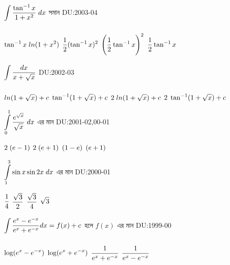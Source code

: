 \documentclass[addpoints]{exam}
\begin{document}
\begin{questions}
\question  $\mathlarger{\int\limits_{}^{} \frac{\tan^{-1}x}{1+x^2}\;dx}$  সমান
\hfill \textsc{DU:2003-04}

\begin{oneparchoices}

\choice $\mathlarger{\tan^{-1}x\;ln(1+x^2)}$
\choice $\mathlarger{\frac{1}{2} (\tan ^{-1}x)^{2}}$
\choice $\mathlarger{\Bigg(\frac{1}{2} \tan ^{-1}x\Bigg)^{2}}$
\choice $\mathlarger{\frac{1}{2} \tan ^{-1}x}$
\end{oneparchoices}

\question  $\mathlarger{\int\limits_{}^{} \frac{dx}{x+\sqrt{x}}}$
\hfill \textsc{DU:2002-03}

\begin{oneparchoices}

\choice $\mathlarger{ln(1+\sqrt{x})+c}$
\choice $\mathlarger{\tan ^{-1}(1+\sqrt{x})+c}$
\choice $\mathlarger{2\;ln(1+\sqrt{x})+c}$
\choice $\mathlarger{2\;\tan ^{-1}(1+\sqrt{x})+c}$
\end{oneparchoices}

\question  $\mathlarger{\int\limits_{0}^{1} \frac{e^{\sqrt{x}}}{\sqrt{x}}\;dx}$ এর মান
\hfill \textsc{DU:2001-02,00-01}

\begin{oneparchoices}

\choice $\mathlarger{2\;(e-1)}$
\choice $\mathlarger{2\;(e+1)}$
\choice $\mathlarger{(1-e)}$
\choice $\mathlarger{(e+1)}$
\end{oneparchoices}

\question   $\mathlarger{\int\limits_{1}^{3} \sin x \sin 2x\;dx}$  এর মান \hfill \textsc{DU:2000-01}

\begin{oneparchoices}
 \choice $\mathlarger{\frac{1}{4}}$
 \choice $\mathlarger{\frac{\sqrt{3}}{2}}$
\choice $\mathlarger{\frac{\sqrt{3}}{4}}$
\choice $\mathlarger{\sqrt{3}}$
\end{oneparchoices}

\question  $\mathlarger{\int\limits_{}^{} \frac{e^{x}-e^{-x}}{e^{x}+e^{-x}}dx = f(x)+c}$ হলে $f(x)$ এর মান \hfill \textsc{DU:1999-00}

\begin{oneparchoices}

\choice $\mathlarger{\log (e^{x}-e^{-x})}$
\choice $\mathlarger{\log (e^{x}+e^{-x})}$
\choice $\mathlarger{\frac{1}{e^{x}+e^{-x}}}$
\choice $\mathlarger{\frac{1}{e^{x}-e^{-x}}}$

\end{oneparchoices}


\end{questions}
\end{document}

